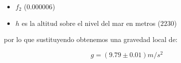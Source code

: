\documentclass[DIV=calc, paper=a4, fontsize=11pt]{scrartcl}
\begin{document}
\begin{multicols}{2}
\begin{itemize}
    \item $f_2$ ($0.000006$)
    
    \item $h$ es la altitud sobre el nivel del mar en metros ($2230$)

\end{itemize}

\noindent por lo que sustituyendo obtenemos una gravedad local de:

\begin{equation*}
    g = (9.79 \pm 0.01)  m/s^2
\end{equation*}


 



\end{multicols}
\end{document}
